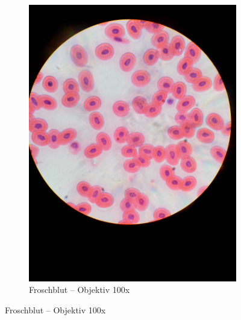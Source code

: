 \begin{figure}[h!]
\begin{subfigure}[b]{0.45\textwidth}
		\includegraphics[angle=270, width=1\textwidth]{../images/01_frog_blood.jpg}
		\caption{Froschblut -- Objektiv 100x}
	\end{subfigure}


\end{figure}
